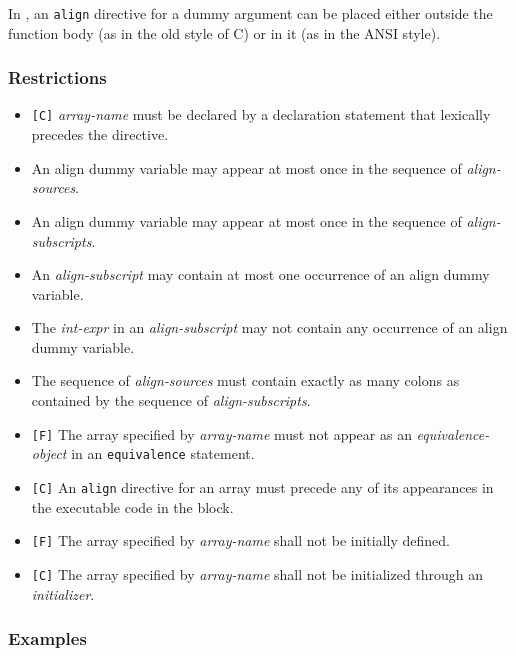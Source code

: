 In {\XMPC}, an {\tt align} directive for a dummy argument can be placed
either outside the function body (as in the old style of C) or in it (as
in the ANSI style).

\subsubsection*{Restrictions}

\begin{itemize}
 \item \verb![C]! {\it array-name} must be declared by a declaration
       statement that lexically precedes the directive.
\item An align dummy variable may appear at most once in
      the sequence of {\it align-sources}.
\item An align dummy variable may appear at most once in the sequence of
      {\it align-subscripts}.
\item An {\it align-subscript} may contain at most one occurrence of an
      align dummy variable.
\item The {\it int-expr} in an {\it align-subscript} may not contain any
      occurrence of an align dummy variable.
\item The sequence of {\it align-sources} must contain exactly as many
      colons as contained by the sequence of {\it align-subscripts}.
\item \verb![F]! The array specified by {\it array-name} must not appear
      as an {\it equivalence-object} in an {\tt equivalence} statement.
\item \verb![C]! An {\tt align} directive for an array must
      precede any of its appearances in the executable code in the block.
\item \verb![F]! The array specified by {\it array-name} shall not be
	  initially defined.
\item \verb![C]! The array specified by {\it array-name} shall not be
	  initialized through an {\it initializer}.
\end{itemize}

\subsubsection*{Examples}

